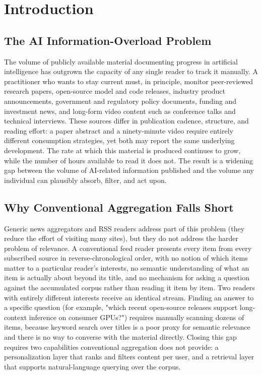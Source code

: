 \chapter{Introduction}
\label{ch:introduction}

\section{The AI Information-Overload Problem}

The volume of publicly available material documenting progress in artificial intelligence has outgrown the capacity of any single reader to track it manually. A practitioner who wants to stay current must, in principle, monitor peer-reviewed research papers, open-source model and code releases, industry product announcements, government and regulatory policy documents, funding and investment news, and long-form video content such as conference talks and technical interviews. These sources differ in publication cadence, structure, and reading effort: a paper abstract and a ninety-minute video require entirely different consumption strategies, yet both may report the same underlying development. The rate at which this material is produced continues to grow, while the number of hours available to read it does not. The result is a widening gap between the volume of AI-related information published and the volume any individual can plausibly absorb, filter, and act upon.

\section{Why Conventional Aggregation Falls Short}

Generic news aggregators and RSS readers address part of this problem (they reduce the effort of visiting many sites), but they do not address the harder problem of relevance. A conventional feed reader presents every item from every subscribed source in reverse-chronological order, with no notion of which items matter to a particular reader's interests, no semantic understanding of what an item is actually about beyond its title, and no mechanism for asking a question against the accumulated corpus rather than reading it item by item. Two readers with entirely different interests receive an identical stream. Finding an answer to a specific question (for example, "which recent open-source releases support long-context inference on consumer GPUs?") requires manually scanning dozens of items, because keyword search over titles is a poor proxy for semantic relevance and there is no way to converse with the material directly. Closing this gap requires two capabilities conventional aggregation does not provide: a personalization layer that ranks and filters content per user, and a retrieval layer that supports natural-language querying over the corpus.


